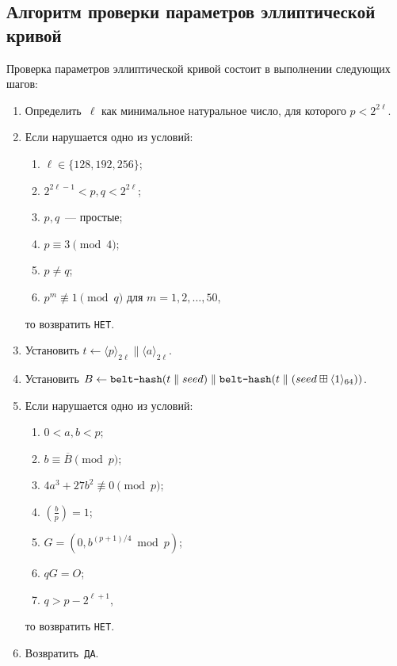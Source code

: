 \subsection{Алгоритм проверки параметров эллиптической кривой}\label{VALEC}

Проверка параметров эллиптической кривой состоит 
в выполнении следующих шагов:
\begin{enumerate}
\item
Определить~$\ell$ как минимальное натуральное число, 
для которого $p<2^{2\ell}$.
\item
Если нарушается одно из условий:
\begin{enumerate}
\item
$\ell\in\{128,192,256\}$;
\item
$2^{2\ell-1}<p,q<2^{2\ell}$;
\item
$p,q$~--- простые;
\item
$p\equiv 3\pmod{4}$;
\item
$p\neq q$;
\item
$p^m\not\equiv 1\pmod{q}$ для $m=1,2,\ldots,50$,
\end{enumerate}
то возвратить \texttt{НЕТ}.

\item
Установить
$t\leftarrow \langle p\rangle_{2\ell}\parallel \langle a\rangle_{2\ell}$.

\item
Установить
$B\leftarrow 
\texttt{belt-hash}(t\parallel seed)
\parallel
\texttt{belt-hash}(t\parallel(
seed\boxplus\langle 1\rangle_{64}))$.

\item
Если нарушается одно из условий:
\begin{enumerate}
\item
$0<a,b<p$;
\item
$b\equiv \overline{B}\pmod p$;
\item
$4a^3+27b^2\not\equiv 0\pmod{p}$;
\item
$\left(\frac{b}{p}\right)=1$;
\item
$G=(0,b^{(p+1)/4}\bmod p)$;
\item
$qG=O$;
\item
$q>p-2^{\ell+1}$,
\end{enumerate}
то возвратить \texttt{НЕТ}.
\item
Возвратить~\texttt{ДА}.
\end{enumerate}
